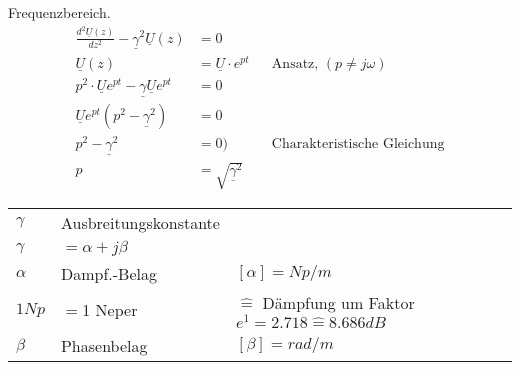 Frequenzbereich.\\
\begin{align}
	\frac{d^2\underline{U}(z)}{dz^2}-\underline{\gamma}^2\underline{U}(z)&=0\nonumber\\
	\underline{U}(z)&=\underline{U}\cdot e^{pt}&&\text{Ansatz, }(p \neq
	j\omega)\nonumber\\
	p^2\cdot
	\underline{U}e^{pt}-\underline{\gamma}\underline{U}e^{pt}&=0\nonumber\\
	\underline{U}e^{pt}\left(p^2-\underline{\gamma}^2\right)&=0\nonumber\\
	p^2-\underline{\gamma}^2&=0)&&\text{Charakteristische Gleichung}\nonumber\\
	p&=\sqrt{\underline{\gamma}^2}\nonumber
\end{align}
\begin{tabular}{lll}
$\gamma$ & Ausbreitungskonstante \\
$\gamma$ & $= \alpha +j\beta$ \\
$\alpha$ & Dampf.-Belag & $[\alpha]=Np/m$\\
$1Np$ & $=$1 Neper & $\mathrel{\widehat{=}}$ Dämpfung um Faktor
$e^1=2.718\mathrel{\widehat{=}}8.686dB$\\
$\beta$ & Phasenbelag & $[\beta]=rad/m$\\
\end{tabular}

